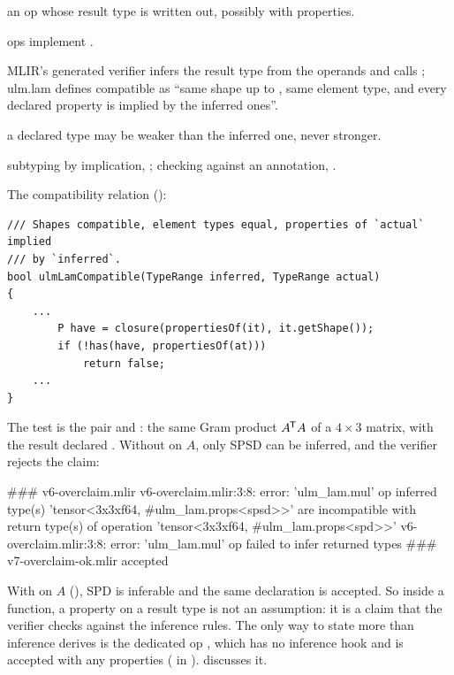 \begin{steps}
\item[Input] an op whose result type is written out, possibly with properties.
\item[Representation]  ops implement .
\item[Rule] MLIR's generated verifier infers the result type from the operands and calls ; ulm.lam defines compatible as ``same shape up to , same element type, and every declared property is implied by the inferred ones''.
\item[Output] a declared type may be weaker than the inferred one, never stronger.
\item[Theory] subtyping by implication, ; checking against an annotation, .
\end{steps}

The compatibility relation ():

\begin{lstlisting}[style=cpp]
/// Shapes compatible, element types equal, properties of `actual` implied
/// by `inferred`.
bool ulmLamCompatible(TypeRange inferred, TypeRange actual)
{
    ...
        P have = closure(propertiesOf(it), it.getShape());
        if (!has(have, propertiesOf(at)))
            return false;
    ...
}
\end{lstlisting}

The test is the pair  and : the same Gram product
\(A^{\mkern-1.5mu\mathsf{T}} A\) of a \(4\times 3\) matrix, with the result declared .
Without  on \(A\), only SPSD can be inferred, and the
verifier rejects the claim:

\begin{textout}
### v6-overclaim.mlir
v6-overclaim.mlir:3:8: error: 'ulm_lam.mul' op inferred type(s) 'tensor<3x3xf64, #ulm_lam.props<spsd>>' are incompatible with return type(s) of operation 'tensor<3x3xf64, #ulm_lam.props<spd>>'
v6-overclaim.mlir:3:8: error: 'ulm_lam.mul' op failed to infer returned types
### v7-overclaim-ok.mlir
accepted
\end{textout}

With  on \(A\) (), SPD is inferable and the same
declaration is accepted. So inside a function, a property on a result type
is not an assumption: it is a claim that the verifier checks against the
inference rules. The only way to state more than inference derives is the
dedicated op , which has no inference hook and is
accepted with any properties ( in ).
 discusses it.

